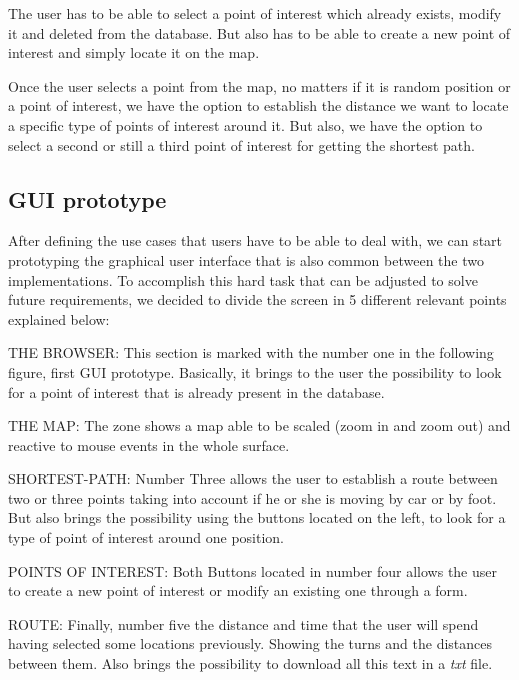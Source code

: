 \documentclass{article}
\begin{document}
The user has to be able to select a point of interest which already exists, modify it and deleted from the database. But also has to be able to create a new point of interest and simply locate it on the map.

Once the user selects a point from the map, no matters if it is random position or a point of interest, we have the option to establish the distance we want to locate a specific type of points of interest around it. But also, we have the option to select a second or still a third point of interest for getting the shortest path.

\subsection{GUI prototype}
After defining the use cases that users have to be able to deal with, we can start prototyping the graphical user interface that is also common between the two implementations. To accomplish this hard task that can be adjusted to solve future requirements, we decided to divide the screen in 5 different relevant points explained below:

THE BROWSER: This section is marked with the number one in the following figure, first GUI prototype. Basically, it brings to the user the possibility to look for a point of interest that is already present in the database.

THE MAP: The zone shows a map able to be scaled (zoom in and zoom out) and reactive to mouse events in the whole surface.

SHORTEST-PATH: Number Three allows the user to establish a route between two or three points taking into account if he or she is moving by car or by foot. But also brings the possibility using the buttons located on the left, to look for a type of point of interest around one position.

POINTS OF INTEREST: Both Buttons located in number four allows the user to create a new point of interest or modify an existing one through a form.

ROUTE: Finally, number five the distance and time that the user will spend having selected some locations previously. Showing the turns and the distances between them. Also brings the possibility to download all this text in a \textit{txt} file.
\end{document}
